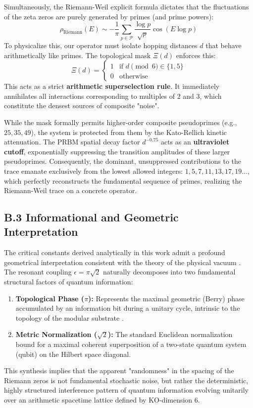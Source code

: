 \documentclass[prl,aps,floatfix,superscriptaddress,10pt]{revtex4-2}
\begin{document}
Simultaneously, the Riemann-Weil explicit formula dictates that the fluctuations of the zeta zeros are purely generated by primes (and prime powers):
\begin{equation}
\rho_{\text{Riemann}}(E) \sim -\frac{1}{\pi} \sum_{p \in \mathcal{P}} \frac{\log p}{\sqrt{p}} \cos(E \log p)
\end{equation}
To physicalize this, our operator must isolate hopping distances $d$ that behave arithmetically like primes. The topological mask $\Xi(d)$ enforces this:
\begin{equation}
\Xi(d) = \begin{cases} 1 & \text{if } d \pmod 6 \in \{1, 5\} \\ 0 & \text{otherwise} \end{cases}
\end{equation}
This acts as a strict \textbf{arithmetic superselection rule}. It immediately annihilates all interactions corresponding to multiples of 2 and 3, which constitute the densest sources of composite "noise". 

While the mask formally permits higher-order composite pseudoprimes (e.g., $25, 35, 49$), the system is protected from them by the Kato-Rellich kinetic attenuation. The PRBM spatial decay factor $d^{-0.75}$ acts as an \textbf{ultraviolet cutoff}, exponentially suppressing the transition amplitudes of these larger pseudoprimes. Consequently, the dominant, unsuppressed contributions to the trace emanate exclusively from the lowest allowed integers: $1, 5, 7, 11, 13, 17, 19\dots$, which perfectly reconstructs the fundamental sequence of primes, realizing the Riemann-Weil trace on a concrete operator.

\subsection{B.3 Informational and Geometric Interpretation}

The critical constants derived analytically in this work admit a profound geometrical interpretation consistent with the theory of the physical vacuum \cite{PeinadorGenesis, PeinadorPi}. The resonant coupling $\epsilon = \pi\sqrt{2}$ naturally decomposes into two fundamental structural factors of quantum information:
\begin{enumerate}
    \item \textbf{Topological Phase ($\pi$):} Represents the maximal geometric (Berry) phase accumulated by an information bit during a unitary cycle, intrinsic to the topology of the modular substrate \cite{PeinadorPi}.
    \item \textbf{Metric Normalization ($\sqrt{2}$):} The standard Euclidean normalization bound for a maximal coherent superposition of a two-state quantum system (qubit) on the Hilbert space diagonal.
\end{enumerate}
This synthesis implies that the apparent "randomness" in the spacing of the Riemann zeros is not fundamental stochastic noise, but rather the deterministic, highly structured interference pattern of quantum information evolving unitarily over an arithmetic spacetime lattice defined by KO-dimension 6.
\end{document}
